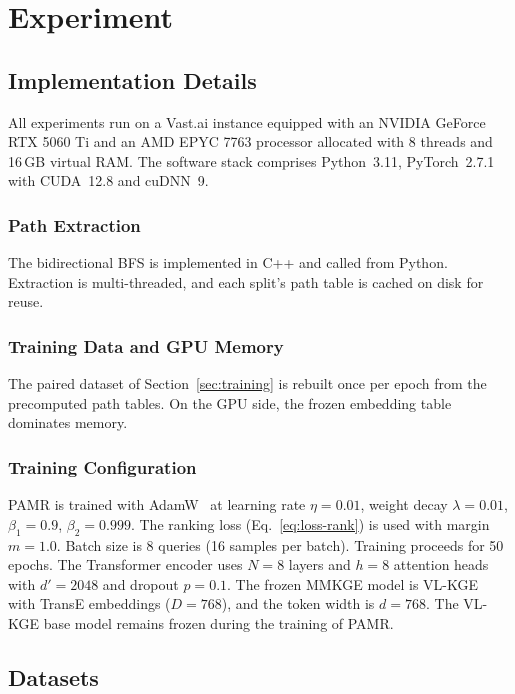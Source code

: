 \documentclass[runningheads]{llncs}
\begin{document}
\section{Experiment}
\label{sec:experiment}
\subsection{Implementation Details}
\label{sec:implementation}

All experiments run on a Vast.ai instance equipped with an NVIDIA
GeForce RTX 5060 Ti and an AMD EPYC 7763 processor allocated with 8 threads
and 16\,GB virtual RAM. The software stack comprises Python~3.11,
PyTorch~2.7.1 with CUDA~12.8 and cuDNN~9.

\subsubsection{Path Extraction}
The bidirectional BFS is implemented in C++ and called from Python.
Extraction is multi-threaded, and each split's path table is cached on
disk for reuse.

\subsubsection{Training Data and GPU Memory}
The paired dataset of Section~\ref{sec:training} is rebuilt once per epoch
from the precomputed path tables. On the GPU side, the frozen embedding
table dominates memory.

\subsubsection{Training Configuration}
PAMR is trained with AdamW~\cite{loshchilov2019decoupled} at learning
rate $\eta = 0.01$, weight decay $\lambda = 0.01$, $\beta_1 = 0.9$,
$\beta_2 = 0.999$. The ranking loss (Eq.~\ref{eq:loss-rank}) is
used with margin $m = 1.0$. Batch size is 8 queries (16 samples per
batch). Training proceeds for 50 epochs. The Transformer encoder uses
$N = 8$ layers and $h = 8$ attention heads with
$d' = 2048$ and dropout $p = 0.1$. The frozen MMKGE model is
VL-KGE~\cite{efthymiou2026vlkge} with TransE embeddings ($D = 768$), and
the token width is $d = 768$. The VL-KGE base model remains frozen
during the training of PAMR.

\subsection{Datasets}
\label{sec:datasets}
\end{document}

